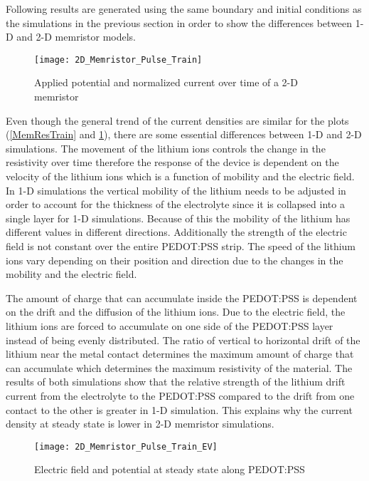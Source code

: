 \begin{doublespace}
Following results are generated using the same boundary and initial conditions as the simulations in the previous section in order to show the differences between 1-D and 2-D memristor models.

\begin{figure}[!htp]
\centering
\texttt{[image: 2D\_Memristor\_Pulse\_Train]}
\caption{Applied potential and normalized current over time of a 2-D memristor} 
\label{2D_mem_train}
\end{figure}

 Even though the general trend of the current densities are similar for the plots (\ref{MemResTrain} and \ref{2D_mem_train}), there are some essential differences between 1-D and 2-D simulations. The movement of the lithium ions controls the change in the resistivity over time therefore the response of the device is dependent on the velocity of the lithium ions which is a function of mobility and the electric field. In 1-D simulations the vertical mobility of the lithium needs to be adjusted in order to account for the thickness of the electrolyte since it is collapsed into a single layer for 1-D simulations. Because of this the mobility of the lithium has different values in different directions. Additionally the strength of the electric field is not constant over the entire PEDOT:PSS strip. The speed of the lithium ions vary depending on their position and direction due to the changes in the mobility and the electric field.
 
The amount of charge that can accumulate inside the PEDOT:PSS is dependent on the drift and the diffusion of the lithium ions. Due to the electric field, the lithium ions are forced to accumulate on one side of the PEDOT:PSS layer instead of being evenly distributed. The ratio of vertical to horizontal drift of the lithium near the metal contact determines the maximum amount of charge that can accumulate which determines the maximum resistivity of the material. The results of both simulations show that the relative strength of the lithium drift current from the electrolyte to the PEDOT:PSS compared to the drift from one contact to the other is greater in 1-D simulation. This explains why the current density at steady state is lower in 2-D memristor simulations. 

\begin{figure}[!htp]
\centering
\texttt{[image: 2D\_Memristor\_Pulse\_Train\_EV]}
\caption{Electric field and potential at steady state along PEDOT:PSS} 
\label{2D_E_V_ss}
\end{figure}


\end{doublespace}
